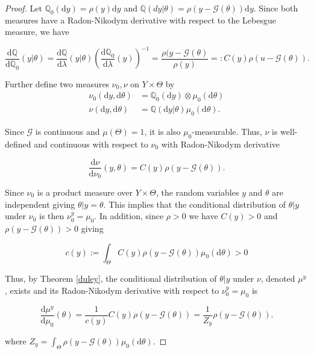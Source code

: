 \begin{proof}
  Let $\mathbb{Q}_0(\text{d}y) = \rho(y)\text{d}y$ and $\mathbb{Q}(dy|\theta) = \rho(y - \mathcal{G}(\theta))\text{d}y$. Since both measures have a Radon-Nikodym derivative with respect to the Lebesgue measure, we have

  \begin{equation*}
    \frac{\text{d}\mathbb{Q}}{\text{d}\mathbb{Q}_0}(y|\theta) = \frac{\text{d}\mathbb{Q}}{\text{d}\lambda}(y|\theta)\left(\frac{\text{d}\mathbb{Q}_0}{\text{d}\lambda}(y)\right)^{-1} = \frac{\rho(y - \mathcal{G}(\theta)}{\rho(y)} =: C(y)\rho(u - \mathcal{G}(\theta)).
  \end{equation*}

  Further define two measures $\nu_0, \nu$ on $Y \times \Theta$ by
  \begin{equation*}
    \begin{aligned}
      \nu_0(\text{d}y, \text{d}\theta) &= \mathbb{Q}_0(\text{d}y) \otimes \mu_0(\text{d}\theta)\\
      \nu(\text{d}y, \text{d}\theta) &= \mathbb{Q}(\text{d}y|\theta) \mu_0(\text{d}\theta).
    \end{aligned}
  \end{equation*}

  
  Since $\mathcal{G}$ is continuous and $\mu(\Theta) = 1$, it is also $\mu_0$-measurable. Thus, $\nu$ is well-defined and continuous with respect to $\nu_0$ with Radon-Nikodym derivative

  \begin{equation*}
    \frac{\text{d}\nu}{\text{d}\nu_0}(y, \theta) = C(y)\rho(y - \mathcal{G}(\theta)).
  \end{equation*}

  Since $\nu_0$ is a product measure over $Y \times \Theta$, the random variables $y$ and $\theta$ are independent giving $\theta|y = \theta$. This implies that the conditional distribution of $\theta|y$ under $\nu_0$ is then $\nu_0^y = \mu_0$. In addition, since $\rho > 0$ we have $C(y) > 0$ and $\rho(y - \mathcal{G}(\theta)) > 0$ giving

  \begin{equation*}
    c(y) := \int_\Theta C(y)\rho(y - \mathcal{G}(\theta))\mu_0(\text{d}\theta) > 0 
  \end{equation*}

  Thus, by Theorem \ref{duley}, the conditional distribution of $\theta|y$ under $\nu$, denoted $\mu^y$, exists and its Radon-Nikodym derivative with respect to $\nu_0^y = \mu_0$ is

  \begin{equation*}
    \frac{\text{d}\mu^y}{\text{d}\mu_0}(\theta) = \frac1{c(y)}C(y)\rho(y - \mathcal{G}(\theta)) =  \frac1{Z_y}\rho(y - \mathcal{G}(\theta)).
  \end{equation*}
  
  where $Z_y = \int_\Theta\rho(y - \mathcal{G}(\theta))\mu_0(\text{d}\theta)$.
\end{proof}

